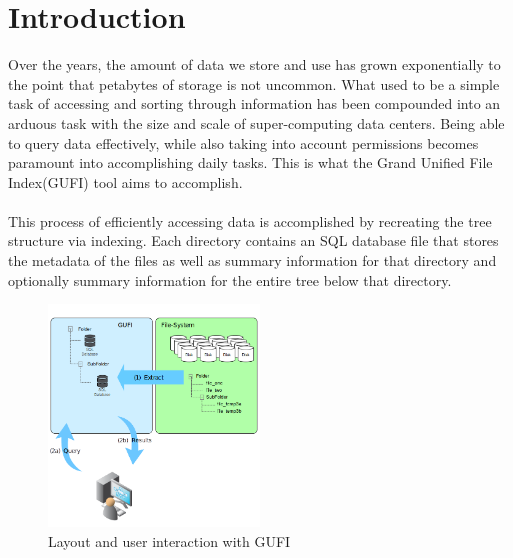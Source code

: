 \section{Introduction}
Over the years, the amount of data we store and use has grown exponentially to the point that petabytes of storage is not uncommon. What used to be a simple task of accessing and sorting through information has been compounded into an arduous task with the size and scale of super-computing data centers. Being able to query data effectively, while also taking into account permissions becomes paramount into accomplishing daily tasks. This is what the Grand Unified File Index(GUFI) tool aims to accomplish. 
\\
\\
This process of efficiently accessing data is accomplished by recreating the tree structure via indexing. Each directory contains an SQL database file that stores the metadata of the files as well as summary information for that directory and optionally summary information for the entire tree below that directory. 

\begin{figure} [h]
\centering
\includegraphics[width=0.5\textwidth]{images/gufi_structure.png}
\caption{\label{fig:gufi_structure}Layout and user interaction with GUFI}
\end{figure}
